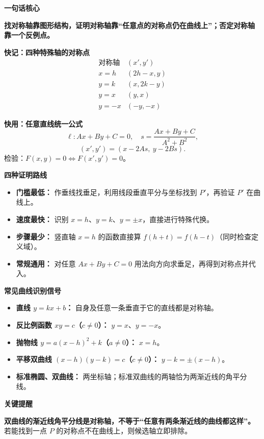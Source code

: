 \begin{summarybox}
\textbf{\textcolor{CSummary}{一句话核心}}

\textbf{找对称轴靠图形结构，证明对称轴靠“任意点的对称点仍在曲线上”；否定对称轴靠一个反例点。}

\medskip
\textbf{\textcolor{CSummary}{快记：四种特殊轴的对称点}}
\[
\begin{array}{c|c}
\text{对称轴}&(x',y')\\\hline
x=h&(2h-x,y)\\
y=k&(x,2k-y)\\
y=x&(y,x)\\
y=-x&(-y,-x)
\end{array}
\]

\medskip
\textbf{\textcolor{CSummary}{快用：任意直线统一公式}}
\[
\ell:Ax+By+C=0,\quad s=\frac{Ax+By+C}{A^2+B^2},
\]
\[
\boxed{(x',y')=(x-2As,\ y-2Bs)}.
\]
检验：$\boxed{F(x,y)=0\Longleftrightarrow F(x',y')=0}$。

\medskip
\textbf{\textcolor{CSummary}{四种证明路线}}
\begin{itemize}[leftmargin=*, itemsep=0.4em, topsep=0.3em]
  \item \textbf{门槛最低：} 作垂线找垂足，利用线段垂直平分与坐标找到 $P'$，再验证 $P'$ 在曲线上。
  \item \textbf{速度最快：} 识别 $x=h$、$y=k$、$y=\pm x$，直接进行特殊代换。
  \item \textbf{步骤最少：} 竖直轴 $x=h$ 的函数直接算 $f(h+t)=f(h-t)$（同时检查定义域）。
  \item \textbf{常规通用：} 对任意 $Ax+By+C=0$ 用法向方向求垂足，再得到对称点并代入。
\end{itemize}

\medskip
\textbf{\textcolor{CSummary}{常见曲线识别信号}}
\begin{itemize}[leftmargin=*, itemsep=0.35em]
  \item \textbf{直线 $y=kx+b$：} 自身及任意一条垂直于它的直线都是对称轴。
  \item \textbf{反比例函数 $xy=c$（$c\ne0$）：} $y=x$、$y=-x$。
  \item \textbf{抛物线 $y=a(x-h)^2+k$（$a\ne0$）：} $x=h$。
  \item \textbf{平移双曲线 $(x-h)(y-k)=c$（$c\ne0$）：} $y-k=\pm(x-h)$。
  \item \textbf{标准椭圆、双曲线：} 两坐标轴；标准双曲线的两轴恰为两渐近线的角平分线。
\end{itemize}

\medskip
\textbf{\textcolor{CSummary}{关键提醒}}

\textbf{双曲线的渐近线角平分线是对称轴，不等于“任意有两条渐近线的曲线都这样”。} 若能找到一点 $P$ 的对称点不在曲线上，则候选轴立即排除。
\end{summarybox}
